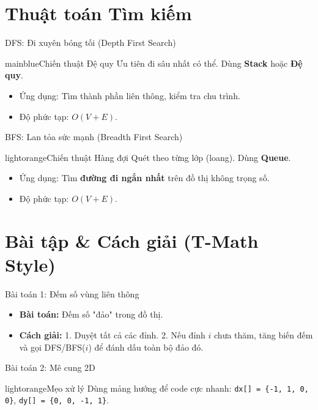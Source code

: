 \documentclass[10pt, xcolor={dvipsnames}]{beamer}
\begin{document}
\section{Thuật toán Tìm kiếm}
\begin{frame}{DFS: Đi xuyên bóng tối (Depth First Search)}
    \begin{beautybox}{mainblue}{Chiến thuật Đệ quy}
        Ưu tiên đi sâu nhất có thể. Dùng \textbf{Stack} hoặc \textbf{Đệ quy}.
    \end{beautybox}
    \begin{itemize}
        \item Ứng dụng: Tìm thành phần liên thông, kiểm tra chu trình.
        \item Độ phức tạp: $O(V + E)$.
    \end{itemize}
\end{frame}

\begin{frame}{BFS: Lan tỏa sức mạnh (Breadth First Search)}
    \begin{beautybox}{lightorange}{Chiến thuật Hàng đợi}
        Quét theo từng lớp (loang). Dùng \textbf{Queue}.
    \end{beautybox}
    \begin{itemize}
        \item Ứng dụng: Tìm \textbf{đường đi ngắn nhất} trên đồ thị không trọng số.
        \item Độ phức tạp: $O(V + E)$.
    \end{itemize}
\end{frame}

\section{Bài tập & Cách giải (T-Math Style)}
\begin{frame}{Bài toán 1: Đếm số vùng liên thông}
    \begin{itemize}
        \item \textbf{Bài toán:} Đếm số "đảo" trong đồ thị.
        \item \textbf{Cách giải:} 
            1. Duyệt tất cả các đỉnh.
            2. Nếu đỉnh $i$ chưa thăm, tăng biến đếm và gọi DFS/BFS($i$) để đánh dấu toàn bộ đảo đó.
    \end{itemize}
\end{frame}

\begin{frame}{Bài toán 2: Mê cung 2D}
    \begin{beautybox}{lightorange}{Mẹo xử lý}
        Dùng mảng hướng để code cực nhanh:
        \texttt{dx[] = \{-1, 1, 0, 0\}}, \texttt{dy[] = \{0, 0, -1, 1\}}.
    \end{beautybox}
    \centering
\end{frame}
\end{document}

